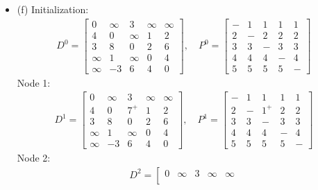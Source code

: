 \documentclass{article}
\theoremstyle{definition}
\theoremstyle{definition}
\theoremstyle{remark}
\begin{document}
\begin{itemize}
	\item (f) Initialization:
	\begin{equation}
		\begin{aligned}
			D^0={
			\left[ \begin{array}{ccccc}
				0 & \infty & 3 & \infty & \infty \\
				4 & 0 & \infty & 1 & 2 \\
				3 & 8 & 0 & 2 & 6 \\
				\infty & 1 & \infty & 0 & 4 \\
				\infty & -3 & 6 & 4 & 0
			\end{array} 
			\right ]}, \quad
			P^0={
			\left[ \begin{array}{ccccc}
				- & 1 & 1 & 1 & 1 \\
				2 & - & 2 & 2 & 2 \\
				3 & 3 & - & 3 & 3 \\
				4 & 4 & 4 & - & 4 \\
				5 & 5 & 5 & 5 & -
			\end{array}
			\right ]}
		\end{aligned}
	\end{equation}
	Node 1:
	\begin{equation}
		\begin{aligned}
			D^1={
			\left[ \begin{array}{ccccc}
				0 & \infty & 3 & \infty & \infty \\
				4 & 0 & 7^+ & 1 & 2 \\
				3 & 8 & 0 & 2 & 6 \\
				\infty & 1 & \infty & 0 & 4 \\
				\infty & -3 & 6 & 4 & 0
			\end{array} 
			\right ]}, \quad
			P^1={
			\left[ \begin{array}{ccccc}
				- & 1 & 1 & 1 & 1 \\
				2 & - & 1^+ & 2 & 2 \\
				3 & 3 & - & 3 & 3 \\
				4 & 4 & 4 & - & 4 \\
				5 & 5 & 5 & 5 & -
			\end{array}
			\right ]}
		\end{aligned}
	\end{equation}
	Node 2:
	\begin{equation}
		\begin{aligned}
			D^2={
			\left[ \begin{array}{ccccc}
				0 & \infty & 3 & \infty & \infty \\

\end{array}}
\end{aligned}
\end{equation}
\end{itemize}
\end{document}
